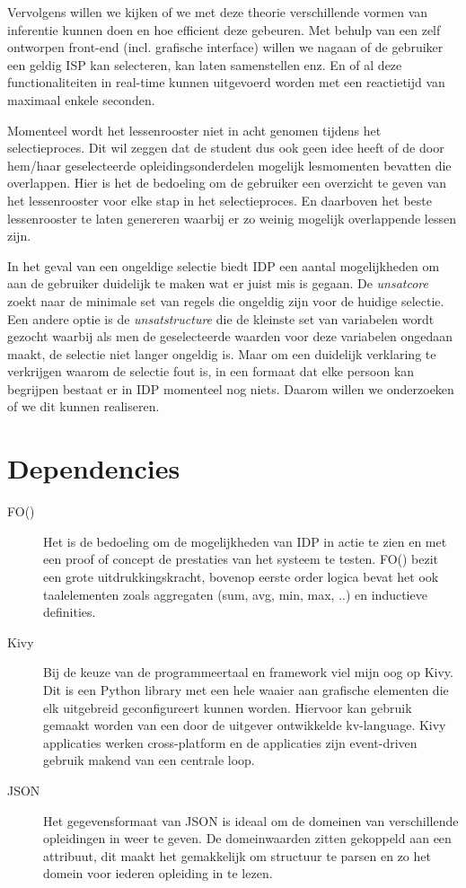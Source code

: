 Vervolgens willen we kijken of we met deze theorie verschillende vormen van inferentie kunnen doen en hoe efficient deze gebeuren. Met behulp van een zelf ontworpen front-end (incl. grafische interface) willen we nagaan of de gebruiker een geldig ISP kan selecteren, kan laten samenstellen enz. En of al deze functionaliteiten in real-time kunnen uitgevoerd worden met een reactietijd van maximaal enkele seconden. 

Momenteel wordt het lessenrooster niet in acht genomen tijdens het selectieproces. Dit wil zeggen dat de student dus ook geen idee heeft of de door hem/haar geselecteerde opleidingsonderdelen mogelijk lesmomenten bevatten die overlappen. Hier is het de bedoeling om de gebruiker een overzicht te geven van het lessenrooster voor elke stap in het selectieproces. En daarboven het beste lessenrooster te laten genereren waarbij er zo weinig mogelijk overlappende lessen zijn.

In het geval van een ongeldige selectie biedt IDP een aantal mogelijkheden om aan de gebruiker duidelijk te maken wat er juist mis is gegaan. De \emph{unsatcore} zoekt naar de minimale set van regels die ongeldig zijn voor de huidige selectie. Een andere optie is de \emph{unsatstructure} die de kleinste set van variabelen wordt gezocht waarbij als men de geselecteerde waarden voor deze variabelen ongedaan maakt, de selectie niet langer ongeldig is. Maar om een duidelijk verklaring te verkrijgen waarom de selectie fout is, in een formaat dat elke persoon kan begrijpen bestaat er in IDP momenteel nog niets. Daarom willen we onderzoeken of we dit kunnen realiseren.

\section{Dependencies}
\begin{description}
\item [FO(\textperiodcentered)] Het is de bedoeling om de mogelijkheden van IDP in actie te zien en met een proof of concept de prestaties van het systeem te testen. FO(\textperiodcentered) bezit een grote uitdrukkingskracht, bovenop eerste order logica bevat het ook taalelementen zoals aggregaten (sum, avg, min, max, ..) en inductieve definities. 
\item [Kivy] Bij de keuze van de programmeertaal en framework viel mijn oog op Kivy. Dit is een Python library met een hele waaier aan grafische elementen die elk uitgebreid geconfigureert kunnen worden. Hiervoor kan gebruik gemaakt worden van een door de uitgever ontwikkelde kv-language. Kivy applicaties werken cross-platform en de applicaties zijn event-driven gebruik makend van een centrale loop.
\item [JSON] Het gegevensformaat van JSON is ideaal om de domeinen van verschillende opleidingen in weer te geven. De domeinwaarden zitten gekoppeld aan een attribuut, dit maakt het gemakkelijk om structuur te parsen en zo het domein voor iederen opleiding in te lezen.
\end{description}